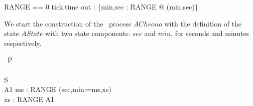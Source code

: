 
\begin{circus}
RANGE == 0 
\also \circchannel tick,time
\also \circchannel out : \{min,sec : RANGE @ (min,sec)\}
\end{circus}
We start the construction of the \Circus\ process $AChrono$ with the
definition of the state $AState$ with two state components: $sec$ and $min$,
for seconds and minutes respectively.
\begin{circus}
\circprocess\ P \circdef\\
\circbegin\\
\circstate S \\
A1 \circdef \circvar ms : RANGE \circspot (sec,min:=ms,xs)\\
\circspot \circvar xs : RANGE \circspot A1\\
\circend
\end{circus}
